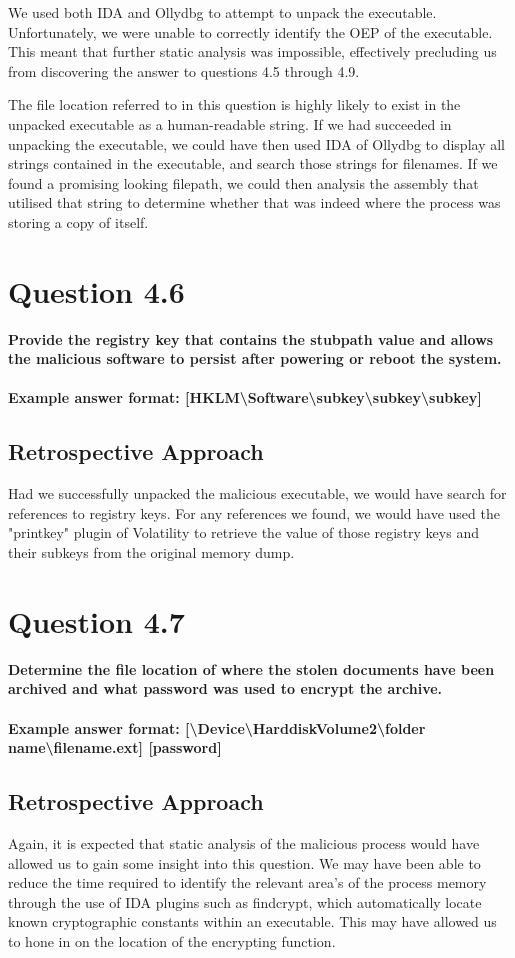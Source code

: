 We used both IDA and Ollydbg to attempt to unpack the executable. Unfortunately, we were unable to correctly identify the OEP of the executable. This meant that further static analysis was impossible, effectively precluding us from discovering the answer to questions 4.5 through 4.9.


The file location referred to in this question is highly likely to exist in the unpacked executable as a human-readable string. If we had succeeded in unpacking the executable, we could have then used IDA of Ollydbg to display all strings contained in the executable, and search those strings for filenames. If we found a promising looking filepath, we could then analysis the assembly that utilised that string to determine whether that was indeed where the process was storing a copy of itself. 
\section{Question 4.6}
\textbf{Provide the registry key that contains the stubpath value and allows the
malicious software to persist after powering or reboot the system.
\\\\
Example answer format:
[HKLM\textbackslash{}Software\textbackslash{}subkey\textbackslash{}subkey\textbackslash{}subkey]}
\subsection{Retrospective Approach}
Had we successfully unpacked the malicious executable, we would have search for references to registry keys. For any references we found, we would have used the "printkey" plugin of Volatility to retrieve the value of those registry keys and their subkeys from the original memory dump.
\section{Question 4.7}
\textbf{Determine the file location of where the stolen documents have been
archived and what password was used to encrypt the archive.
\\\\
Example answer format:
[\textbackslash{}Device\textbackslash{}HarddiskVolume2\textbackslash{}folder
name\textbackslash{}filename.ext] [password]}
\subsection{Retrospective Approach}
Again, it is expected that static analysis of the malicious process would have allowed us to gain some insight into this question. We may have been able to reduce the time required to identify the relevant area's of the process memory through the use of IDA plugins such as findcrypt, which automatically locate known cryptographic constants within an executable. This may have allowed us to hone in on the location of the encrypting function. 
